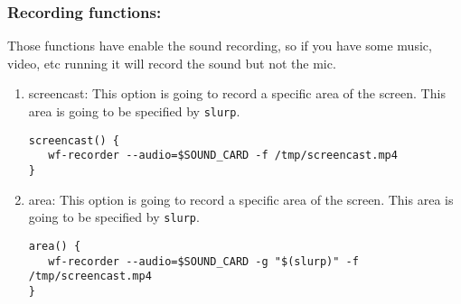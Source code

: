 \documentclass[11pt]{article}
\begin{document}
\subsubsection{Recording functions:}
\label{sec:org9f0ec0e}
Those functions have enable the sound recording, so if you have some music, video, etc running it will record the sound but not the mic.
\begin{enumerate}
\item screencast:
\label{sec:org0740da5}
This option is going to record a specific area of the screen.
This area is going to be specified by \texttt{slurp}.
\begin{verbatim}
screencast() {
   wf-recorder --audio=$SOUND_CARD -f /tmp/screencast.mp4
}
\end{verbatim}
\item area:
\label{sec:orgd865e16}
This option is going to record a specific area of the screen.
This area is going to be specified by \texttt{slurp}.
\begin{verbatim}
area() {
   wf-recorder --audio=$SOUND_CARD -g "$(slurp)" -f /tmp/screencast.mp4
}
\end{verbatim}
\end{enumerate}
\end{document}
